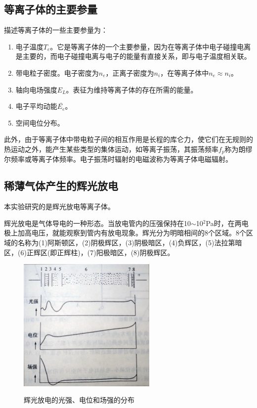 \documentclass[a4paper]{article}
\begin{document}
\subsection{等离子体的主要参量}
描述等离子体的一些主要参量为：
\begin{enumerate}
\item 电子温度$T_e$。它是等离子体的一个主要参量，因为在等离子体中电子碰撞电离是主要的，而电子碰撞电离与电子的能量有直接关系，即与电子温度相关联。
\item 带电粒子密度。电子密度为$n_e$，正离子密度为$n_i$，在等离子体中$n_e\approx n_i$。
\item 轴向电场强度$E_L$。表征为维持等离子体的存在所需的能量。
\item 电子平均动能$\bar{E_e}$。
\item 空间电位分布。
\end{enumerate}
此外，由于等离子体中带电粒子间的相互作用是长程的库仑力，使它们在无规则的热运动之外，能产生某些类型的集体运动，如等离子振荡，其振荡频率$f_p$称为朗缪尔频率或等离子体频率。电子振荡时辐射的电磁波称为等离子体电磁辐射。
\subsection{稀薄气体产生的辉光放电}
本实验研究的是辉光放电等离子体。

辉光放电是气体导电的一种形态。当放电管内的压强保持在10$\sim$10$^2$Pa时，在两电极上加高电压，就能观察到管内有放电现象。辉光分为明暗相间的8个区域。8个区域的名称为(1)阿斯顿区，(2)阴极辉区，(3)阴极暗区，(4)负辉区，(5)法拉第暗区，(6)正辉区(即正辉柱)，(7)阳极暗区，(8)阴极辉区。
\begin{figure}[!h]
\centering
\includegraphics[width=0.6\textwidth]{fig/fig1.jpg}\\
\caption{辉光放电的光强、电位和场强的分布}\label{fig1}
\end{figure}
\end{document}
